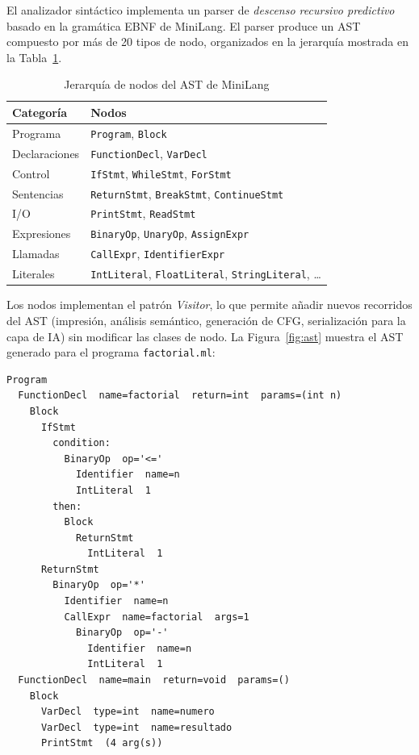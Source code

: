 \documentclass[conference]{IEEEtran}
\begin{document}
El analizador sintáctico implementa un parser de \textit{descenso recursivo predictivo} basado en la gramática EBNF de MiniLang. El parser produce un AST compuesto por más de 20 tipos de nodo, organizados en la jerarquía mostrada en la Tabla~\ref{tab:nodos}.

\begin{table}[h]
\caption{Jerarquía de nodos del AST de MiniLang}
\label{tab:nodos}
\centering
\begin{tabular}{ll}
\hline
\textbf{Categoría} & \textbf{Nodos} \\
\hline
Programa & \texttt{Program}, \texttt{Block} \\
Declaraciones & \texttt{FunctionDecl}, \texttt{VarDecl} \\
Control & \texttt{IfStmt}, \texttt{WhileStmt}, \texttt{ForStmt} \\
Sentencias & \texttt{ReturnStmt}, \texttt{BreakStmt}, \texttt{ContinueStmt} \\
I/O & \texttt{PrintStmt}, \texttt{ReadStmt} \\
Expresiones & \texttt{BinaryOp}, \texttt{UnaryOp}, \texttt{AssignExpr} \\
Llamadas & \texttt{CallExpr}, \texttt{IdentifierExpr} \\
Literales & \texttt{IntLiteral}, \texttt{FloatLiteral}, \texttt{StringLiteral}, \ldots \\
\hline
\end{tabular}
\end{table}

Los nodos implementan el patrón \textit{Visitor}, lo que permite añadir nuevos recorridos del AST (impresión, análisis semántico, generación de CFG, serialización para la capa de IA) sin modificar las clases de nodo. La Figura~\ref{fig:ast} muestra el AST generado para el programa \texttt{factorial.ml}:

\begin{lstlisting}[language={},numbers=none,caption={AST generado para factorial.ml por el ASTPrinter}]
Program
  FunctionDecl  name=factorial  return=int  params=(int n)
    Block
      IfStmt
        condition:
          BinaryOp  op='<='
            Identifier  name=n
            IntLiteral  1
        then:
          Block
            ReturnStmt
              IntLiteral  1
      ReturnStmt
        BinaryOp  op='*'
          Identifier  name=n
          CallExpr  name=factorial  args=1
            BinaryOp  op='-'
              Identifier  name=n
              IntLiteral  1
  FunctionDecl  name=main  return=void  params=()
    Block
      VarDecl  type=int  name=numero
      VarDecl  type=int  name=resultado
      PrintStmt  (4 arg(s))
\end{lstlisting}
\end{document}

